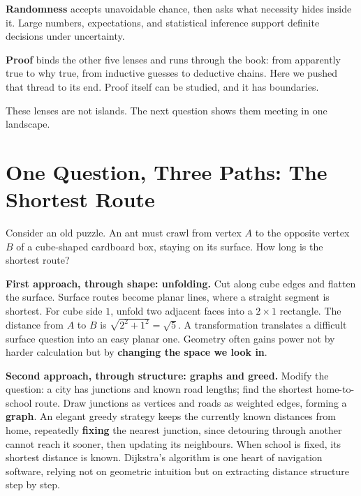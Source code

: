 \textbf{Randomness} accepts unavoidable chance, then asks what necessity hides inside it. Large numbers, expectations, and statistical inference support definite decisions under uncertainty.

\textbf{Proof} binds the other five lenses and runs through the book: from apparently true to why true, from inductive guesses to deductive chains. Here we pushed that thread to its end. Proof itself can be studied, and it has boundaries.

These lenses are not islands. The next question shows them meeting in one landscape.

\section{One Question, Three Paths: The Shortest Route}

Consider an old puzzle. An ant must crawl from vertex $A$ to the opposite vertex $B$ of a cube-shaped cardboard box, staying on its surface. How long is the shortest route?

\textbf{First approach, through shape: unfolding.} Cut along cube edges and flatten the surface. Surface routes become planar lines, where a straight segment is shortest. For cube side $1$, unfold two adjacent faces into a $2 \times 1$ rectangle. The distance from $A$ to $B$ is $\sqrt{2^2 + 1^2} = \sqrt{5}$. A transformation translates a difficult surface question into an easy planar one. Geometry often gains power not by harder calculation but by \textbf{changing the space we look in}.

\textbf{Second approach, through structure: graphs and greed.} Modify the question: a city has junctions and known road lengths; find the shortest home-to-school route. Draw junctions as vertices and roads as weighted edges, forming a \textbf{graph}. An elegant greedy strategy keeps the currently known distances from home, repeatedly \textbf{fixing} the nearest junction, since detouring through another cannot reach it sooner, then updating its neighbours. When school is fixed, its shortest distance is known. Dijkstra's algorithm is one heart of navigation software, relying not on geometric intuition but on extracting distance structure step by step.

\begin{center}
\end{center}

